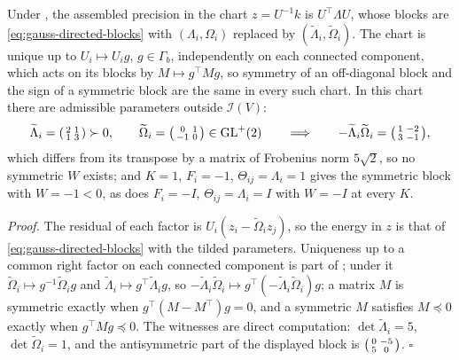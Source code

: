Under , the assembled precision in the chart
\(z=U^{-1}k\) is \(U^\top\Lambda U\), whose blocks are
\eqref{eq:gauss-directed-blocks} with \((\Lambda_i,\Omega_i)\) replaced by
\((\widetilde\Lambda_i,\widetilde\Omega_i)\). The chart is unique up to
\(U_i\mapsto U_ig\), \(g\in\Gamma_b\), independently on each connected component, which acts on its blocks by
\(M\mapsto g^\top Mg\), so symmetry of an off-diagonal block and the sign of a
symmetric block are the same in every such chart. In this chart there are
admissible parameters outside \(\mathcal I(V)\):
\begin{equation}
\widetilde\Lambda_i=\begin{psmallmatrix}2&1\\1&3\end{psmallmatrix}\succ0,
\qquad
\widetilde\Omega_i=\begin{psmallmatrix}0&1\\-1&0\end{psmallmatrix}\in\mathrm{GL}^{+}(2)
\qquad\Longrightarrow\qquad
-\widetilde\Lambda_i\widetilde\Omega_i=\begin{psmallmatrix}1&-2\\3&-1\end{psmallmatrix},
\label{eq:gauss-asymmetry-witness}
\end{equation}
which differs from its transpose by a matrix of Frobenius norm \(5\sqrt2\), so
no symmetric \(W\) exists; and \(K=1\), \(F_i=-1\), \(\Theta_{ij}=\Lambda_i=1\)
gives the symmetric block with \(W=-1<0\), as does \(F_i=-I\),
\(\Theta_{ij}=\Lambda_i=I\) with \(W=-I\) at every \(K\). 

\noindent\emph{Proof.}
The residual of each factor is \(U_i(z_i-\widetilde\Omega_iz_j)\), so the
energy in \(z\) is that of \eqref{eq:gauss-directed-blocks} with the tilded
parameters. Uniqueness up to a common right factor on each connected component is part of
; under it
\(\widetilde\Omega_i\mapsto g^{-1}\widetilde\Omega_ig\) and
\(\widetilde\Lambda_i\mapsto g^\top\widetilde\Lambda_ig\), so
\(-\widetilde\Lambda_i\widetilde\Omega_i\mapsto g^\top(-\widetilde\Lambda_i\widetilde\Omega_i)g\);
a matrix \(M\) is symmetric exactly when \(g^\top(M-M^\top)g=0\), and a
symmetric \(M\) satisfies \(M\preceq0\) exactly when \(g^\top Mg\preceq0\). The
witnesses are direct computation: \(\det\widetilde\Lambda_i=5\),
\(\det\widetilde\Omega_i=1\), and the antisymmetric part of the displayed
block is \(\begin{psmallmatrix}0&-5\\5&0\end{psmallmatrix}\). \(\square\)


